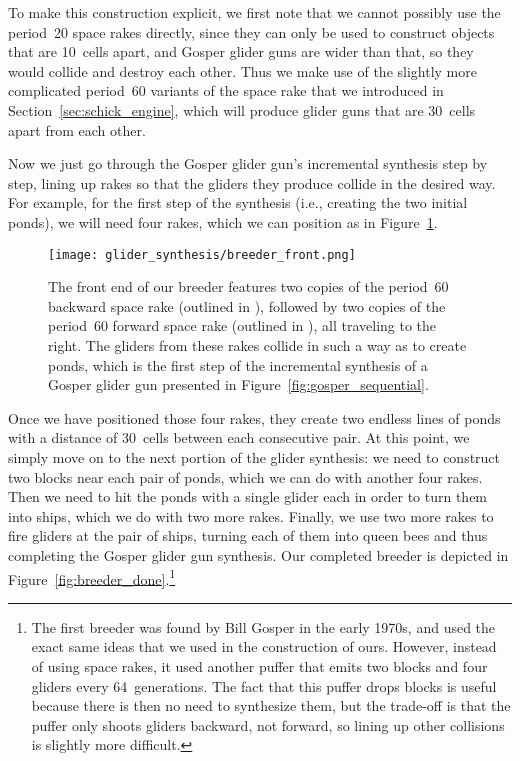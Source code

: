 To make this construction explicit, we first note that we cannot possibly use the period~20 space rakes directly, since they can only be used to construct objects that are 10~cells apart, and Gosper glider guns are wider than that, so they would collide and destroy each other. Thus we make use of the slightly more complicated period~60 variants of the space rake that we introduced in Section~\ref{sec:schick_engine}, which will produce glider guns that are 30~cells apart from each other.

Now we just go through the Gosper glider gun's incremental synthesis step by step, lining up rakes so that the gliders they produce collide in the desired way. For example, for the first step of the synthesis (i.e., creating the two initial ponds), we will need four rakes, which we can position as in Figure~\ref{fig:breeder_front}.
\begin{figure}[!ht]
	\centering\texttt{[image: glider\_synthesis/breeder\_front.png]}
	\caption{The front end of our breeder features two copies of the period~60 backward space rake (outlined in ), followed by two copies of the period~60 forward space rake (outlined in ), all traveling to the right. The gliders from these rakes collide in such a way as to create ponds, which is the first step of the incremental synthesis of a Gosper glider gun presented in Figure~\ref{fig:gosper_sequential}.}\label{fig:breeder_front}
\end{figure}

Once we have positioned those four rakes, they create two endless lines of ponds with a distance of 30~cells between each consecutive pair. At this point, we simply move on to the next portion of the glider synthesis: we need to construct two blocks near each pair of ponds, which we can do with another four rakes. Then we need to hit the ponds with a single glider each in order to turn them into ships, which we do with two more rakes. Finally, we use two more rakes to fire gliders at the pair of ships, turning each of them into queen bees and thus completing the Gosper glider gun synthesis. Our completed breeder is depicted in Figure~\ref{fig:breeder_done}.\footnote{The first breeder was found by Bill Gosper in the early 1970s, and used the exact same ideas that we used in the construction of ours. However, instead of using space rakes, it used another puffer that emits two blocks and four gliders every 64~generations. The fact that this puffer drops blocks is useful because there is then no need to synthesize them, but the trade-off is that the puffer only shoots gliders backward, not forward, so lining up other collisions is slightly more difficult.}

